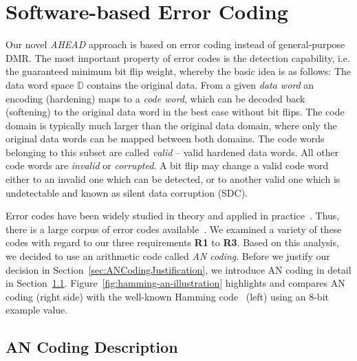 \section{Software-based Error Coding}
\label{sec:ErrorCoding}

Our novel \emph{AHEAD} approach is based on error coding instead of general-purpose DMR. The most important property of error codes is the detection capability, i.e. the guaranteed minimum bit flip weight, whereby the basic idea is as follows: The data word space $\mathbb{D}$ contains the original data. From a given \emph{data word} an encoding (hardening) maps to a \emph{code word}, which can be decoded back (softening) to the original data word in the best case without bit flips. The code domain is typically much larger than the original data domain, where only the original data words can be mapped between both domains. The code words belonging to this subset are called \emph{valid} -- valid hardened data words. All other code words are \emph{invalid} or \emph{corrupted}. A bit flip may change a valid code word either to an invalid one which can be detected, or to another valid one which is undetectable and known as silent data corruption (SDC). 

Error codes have been widely studied in theory and applied in practice~\cite{moon2005error}. Thus, there is a large corpus of error codes available~\cite{moon2005error}. We examined a variety of these codes with regard to our three requirements \textbf{R1} to \textbf{R3}. Based on this analysis, we decided to use an arithmetic code called \emph{AN coding}. Before we justify our decision in Section~\ref{sec:ANCodingJustification}, we introduce AN coding in detail in Section~\ref{sec:ANCodingDescription}. Figure~\ref{fig:hamming-an-illustration} highlights and compares AN coding (right side) with the well-known Hamming code~\cite{hamming1950error} (left) using an $8$-bit example value.  
 

\subsection{AN Coding Description}
\label{sec:ANCodingDescription}

